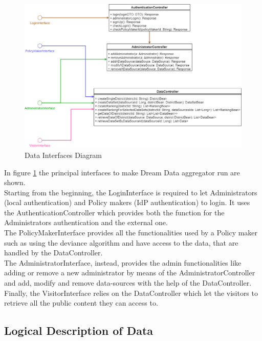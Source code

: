 \begin{figure}[h!]
        \centering
        \includegraphics[scale=0.38]{images/component_interfaces/data_component_interface.png}
        \caption{Data Interfaces Diagram}
        \label{fig:data_interfaces_diagram}
\end{figure}
\FloatBarrier

In figure \ref{fig:data_interfaces_diagram} the principal interfaces to make Dream Data aggregator run are shown.\\
Starting from the beginning, the LoginInterface is required to let Administrators (local authentication) and Policy makers (IdP authentication) to login. It uses the AuthenticationController which provides both the function for the Administrators authentication and the external one.\\
The PolicyMakerInterface provides all the functionalities used by a Policy maker such as using the deviance algorithm and have access to the data, that are handled by the DataController.\\
The AdministratorInterface, instead, provides the admin functionalities like adding or remove a new administrator by means of the AdministratorController and add, modify and remove data-sources with the help of the DataController.\\
Finally, the VisitorInterface relies on the DataController which let the visitors to retrieve all the public content they can access to.
\newpage

\subsection{Logical Description of Data}

